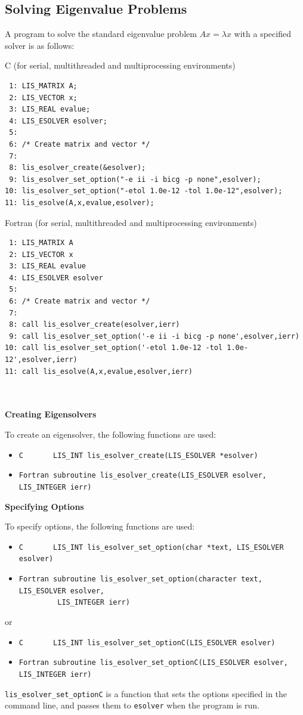 \documentclass[a4paper]{article}
\begin{document}
\subsection{Solving Eigenvalue Problems}\label{subsec:solve}
A program to solve the standard eigenvalue problem $Ax = \lambda x$ with a specified 
solver is as follows: 
\begin{itembox}[l]{C (for serial, multithreaded and multiprocessing environments)}
\small
\begin{verbatim}
 1: LIS_MATRIX A; 
 2: LIS_VECTOR x; 
 3: LIS_REAL evalue; 
 4: LIS_ESOLVER esolver; 
 5: 
 6: /* Create matrix and vector */ 
 7: 
 8: lis_esolver_create(&esolver); 
 9: lis_esolver_set_option("-e ii -i bicg -p none",esolver); 
10: lis_esolver_set_option("-etol 1.0e-12 -tol 1.0e-12",esolver); 
11: lis_esolve(A,x,evalue,esolver); 
\end{verbatim}
\end{itembox}
\begin{itembox}[l]{Fortran (for serial, multithreaded and multiprocessing environments)}
\small
\begin{verbatim}
 1: LIS_MATRIX A 
 2: LIS_VECTOR x 
 3: LIS_REAL evalue
 4: LIS_ESOLVER esolver 
 5:
 6: /* Create matrix and vector */ 
 7:
 8: call lis_esolver_create(esolver,ierr) 
 9: call lis_esolver_set_option('-e ii -i bicg -p none',esolver,ierr) 
10: call lis_esolver_set_option('-etol 1.0e-12 -tol 1.0e-12',esolver,ierr) 
11: call lis_esolve(A,x,evalue,esolver,ierr) 
\end{verbatim}
\end{itembox}
\\ \\
\noindent
{\bf Creating Eigensolvers}

To create an eigensolver, the following functions are used:
\begin{itemize}
\item \verb|C       LIS_INT lis_esolver_create(LIS_ESOLVER *esolver)|
\item \verb|Fortran subroutine lis_esolver_create(LIS_ESOLVER esolver, LIS_INTEGER ierr) |
\end{itemize}

\noindent
{\bf Specifying Options}

To specify options, 
the following functions are used:
\begin{itemize}
\item \verb|C       LIS_INT lis_esolver_set_option(char *text, LIS_ESOLVER esolver)|
\item \verb|Fortran subroutine lis_esolver_set_option(character text, LIS_ESOLVER esolver,|\\
      \verb|         LIS_INTEGER ierr)|
\end{itemize}
or
\begin{itemize}
\item \verb|C       LIS_INT lis_esolver_set_optionC(LIS_ESOLVER esolver)|
\item \verb|Fortran subroutine lis_esolver_set_optionC(LIS_ESOLVER esolver, LIS_INTEGER ierr)|
\end{itemize}
\verb|lis_esolver_set_optionC| is a function that sets the options specified 
in the command line, and passes them to \verb|esolver| when the program is run. 
\end{document}
